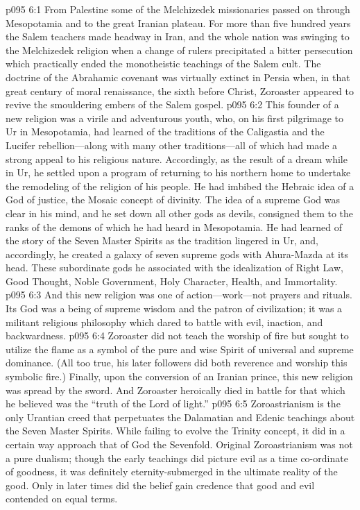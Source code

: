 \vs p095 6:1 From Palestine some of the Melchizedek missionaries passed on through Mesopotamia and to the great Iranian plateau. For more than five hundred years the Salem teachers made headway in Iran, and the whole nation was swinging to the Melchizedek religion when a change of rulers precipitated a bitter persecution which practically ended the monotheistic teachings of the Salem cult. The doctrine of the Abrahamic covenant was virtually extinct in Persia when, in that great century of moral renaissance, the sixth before Christ, Zoroaster appeared to revive the smouldering embers of the Salem gospel.
\vs p095 6:2 This founder of a new religion was a virile and adventurous youth, who, on his first pilgrimage to Ur in Mesopotamia, had learned of the traditions of the Caligastia and the Lucifer rebellion---along with many other traditions---all of which had made a strong appeal to his religious nature. Accordingly, as the result of a dream while in Ur, he settled upon a program of returning to his northern home to undertake the remodeling of the religion of his people. He had imbibed the Hebraic idea of a God of justice, the Mosaic concept of divinity. The idea of a supreme God was clear in his mind, and he set down all other gods as devils, consigned them to the ranks of the demons of which he had heard in Mesopotamia. He had learned of the story of the Seven Master Spirits as the tradition lingered in Ur, and, accordingly, he created a galaxy of seven supreme gods with Ahura\hyp{}Mazda at its head. These subordinate gods he associated with the idealization of Right Law, Good Thought, Noble Government, Holy Character, Health, and Immortality.
\vs p095 6:3 And this new religion was one of action---work---not prayers and rituals. Its God was a being of supreme wisdom and the patron of civilization; it was a militant religious philosophy which dared to battle with evil, inaction, and backwardness.
\vs p095 6:4 Zoroaster did not teach the worship of fire but sought to utilize the flame as a symbol of the pure and wise Spirit of universal and supreme dominance. (All too true, his later followers did both reverence and worship this symbolic fire.) Finally, upon the conversion of an Iranian prince, this new religion was spread by the sword. And Zoroaster heroically died in battle for that which he believed was the “truth of the Lord of light.”
\pc \vs p095 6:5 Zoroastrianism is the only Urantian creed that perpetuates the Dalamatian and Edenic teachings about the Seven Master Spirits. While failing to evolve the Trinity concept, it did in a certain way approach that of God the Sevenfold. Original Zoroastrianism was not a pure dualism; though the early teachings did picture evil as a time co\hyp{}ordinate of goodness, it was definitely eternity\hyp{}submerged in the ultimate reality of the good. Only in later times did the belief gain credence that good and evil contended on equal terms.
